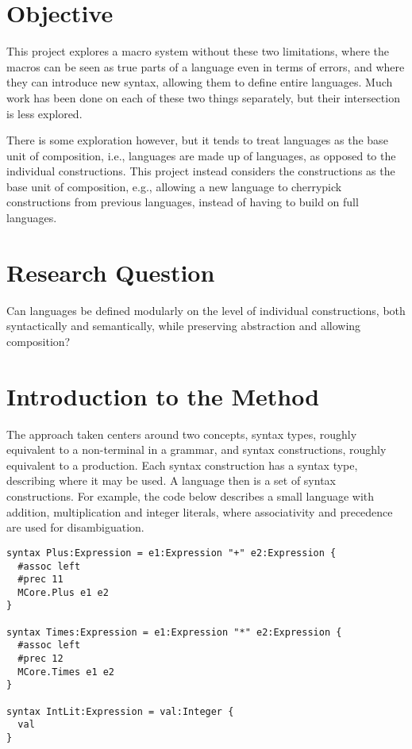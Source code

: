 \documentclass{kththesis}
\begin{document}
\section{Objective}

This project explores a macro system without these two limitations, where the macros can be seen as true parts of a language even in terms of errors, and where they can introduce new syntax, allowing them to define entire languages. Much work has been done on each of these two things separately, but their intersection is less explored.

There is some exploration however, but it tends to treat languages as the base unit of composition, i.e., languages are made up of languages, as opposed to the individual constructions. This project instead considers the constructions as the base unit of composition, e.g., allowing a new language to cherrypick constructions from previous languages, instead of having to build on full languages.

\section{Research Question}

Can languages be defined modularly on the level of individual constructions, both syntactically and semantically, while preserving abstraction and allowing composition?

\section{Introduction to the Method}

The approach taken centers around two concepts, syntax types, roughly equivalent to a non-terminal in a grammar, and syntax constructions, roughly equivalent to a production. Each syntax construction has a syntax type, describing where it may be used. A language then is a set of syntax constructions. For example, the code below describes a small language with addition, multiplication and integer literals, where associativity and precedence are used for disambiguation.

\begin{verbatim}
syntax Plus:Expression = e1:Expression "+" e2:Expression {
  #assoc left
  #prec 11
  MCore.Plus e1 e2
}

syntax Times:Expression = e1:Expression "*" e2:Expression {
  #assoc left
  #prec 12
  MCore.Times e1 e2
}

syntax IntLit:Expression = val:Integer {
  val
}
\end{verbatim}
\end{document}
